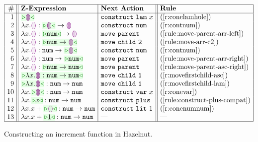 \begin{figure}[t!]
\begin{center}
$\arraycolsep=4px
\begin{array}{|r||l|l||l|l|}
\hline
\# & \textbf{Z-Expression} &
\textbf{Next Action} & \textbf{Rule}
\\
\hline
1 &
\zwsel{\hhole{}} &
\aConstruct{\flam{x}} &
\text{(\ref{r:conelamhole})}
\\ 2 &
\hlam{x}{\hhole{}} : \tarr{\zwsel{\hhole{}}}{\hhole{}} &
\aConstruct{\fnum{}} &
\text{(\ref{r:contnum})}
\\ 3 &
\hlam{x}{\hhole{}} : \tarr{\zwsel{\tnum{}}}{\hhole{}} &
\aMove{\dParent} &
\text{({\ref{rule:move-parent-arr-left}})}
\\ 4 &
\hlam{x}{\hhole{}} : \zwsel{\tarr{\tnum{}}{\hhole{}}} &
\aMove{\dChildn{2}} &
\text{({\ref{rule:move-arr-c2}})}
\\ 5 &
\hlam{x}{\hhole{}} : \tarr{\tnum}{\zwsel{\hhole{}}}
&
\aConstruct{\fnum{}} &
\text{(\ref{r:contnum})}
\\ 6 &
\hlam{x}{\hhole{}} : \tarr{\tnum{}}{\zwsel{\tnum{}}} &
\aMove{\dParent{}} &
\text{(\ref{rule:move-parent-arr-right})}
\\ 7 &
\hlam{x}{\hhole{}} : \zwsel{\tarr{\tnum{}}{\tnum{}}}
&
\aMove{\dParent{}} &
\text{(\ref{rule:move-parent-asc-right})}
\\ 8 &
\zwsel{\hlam{x}{\hhole{}} : \tarr{\tnum}{\tnum}} &
\aMove{\dChildn{1}} &
\text{(\ref{r:movefirstchild-asc})}
\\ 9 &
\zwsel{\hlam{x}{\hhole{}}} : \tarr{\tnum{}}{\tnum{}} &
\aMove{\dChildn{1}} &
\text{(\ref{r:movefirstchild-lam})}
\\ 10 &
\hlam{x}{\zwsel{\hhole{}}} : \tarr{\tnum{}}{\tnum{}} &
\aConstruct{\fvar{x}} &
\text{(\ref{r:conevar})}
\\ 11 &
\hlam{x}{\zwsel{{x}}} : \tarr{\tnum{}}{\tnum{}} &
{\aConstruct{\fplus}}
&
\text{(\ref{rule:construct-plus-compat})}
\\ 12 &
\hlam{x}{\hadd{x}{\zwsel{\hhole{}}}} : \tarr{\tnum{}}{\tnum{}} &
\aConstruct{\fnumlit{1}} &
\text{(\ref{r:conenumnum})}
\\ 13 &
\hlam{x}{\hadd{x}{\zwsel{\hnum{1}}}} : \tarr{\tnum}{\tnum} &
\textrm{---} &
{\textrm{---}}
\\ \hline
\end{array}
$\end{center}\vspace{-6px}
\caption{Constructing an increment function in Hazelnut.}
\label{fig:first-example}
\end{figure}

